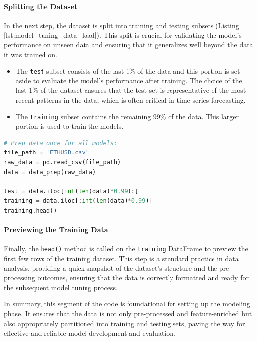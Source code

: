 \paragraph{Splitting the Dataset}
\label{section:splitting_dataset}
In the next step, the dataset is split into training and testing subsets (Listing \ref{lst:model_tuning_data_load}). This split is crucial for validating the model's performance on unseen data and ensuring that it generalizes well beyond the data it was trained on. 
\begin{itemize}
    \item The \texttt{test} subset consists of the last 1\% of the data and this portion is set aside to evaluate the model's performance after training. The choice of the last 1\% of the dataset ensures that the test set is representative of the most recent patterns in the data, which is often critical in time series forecasting.
    \item The \texttt{training} subset contains the remaining 99\% of the data. This larger portion is used to train the models.
\end{itemize}

\begin{lstlisting}[language=python, caption={Model Tuning Loading and Splitting the Dataset}, label={lst:model_tuning_data_load}]
# Prep data once for all models: 
file_path = 'ETHUSD.csv'
raw_data = pd.read_csv(file_path)
data = data_prep(raw_data)

test = data.iloc[int(len(data)*0.99):] 
training = data.iloc[:int(len(data)*0.99)]
training.head()
\end{lstlisting}

\paragraph{Previewing the Training Data}
Finally, the \texttt{head()} method is called on the \texttt{training} DataFrame to preview the first few rows of the training dataset. This step is a standard practice in data analysis, providing a quick snapshot of the dataset's structure and the pre-processing outcomes, ensuring that the data is correctly formatted and ready for the subsequent model tuning process.

In summary, this segment of the code is foundational for setting up the modeling phase. It ensures that the data is not only pre-processed and feature-enriched but also appropriately partitioned into training and testing sets, paving the way for effective and reliable model development and evaluation.


